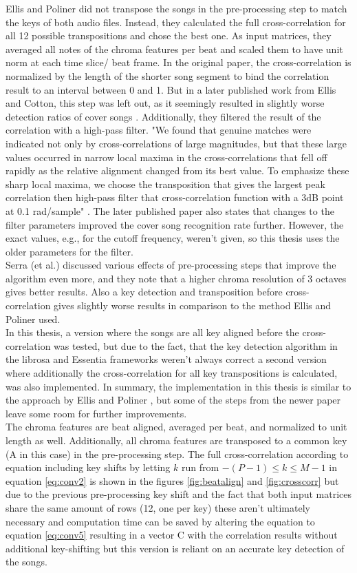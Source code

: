 Ellis and Poliner did not transpose the songs in the pre-processing step to match the keys of both audio files. Instead, they calculated the full cross-correlation for all 12 possible transpositions and chose the best one. 
As input matrices, they averaged all notes of the chroma features per beat and scaled them to have unit norm at each time slice/ beat frame.
In the original paper, the cross-correlation is normalized by the length of the shorter song segment to bind the correlation result to an interval between 0 and 1. But in a later published work from Ellis and Cotton, this step was left out, as it seemingly resulted in slightly worse detection ratios of cover songs \cite{cover802}. 
Additionally, they filtered the result of the correlation with a high-pass filter. "We found that genuine matches were indicated not only by cross-correlations of large magnitudes, but that these large values occurred in narrow local maxima in the cross-correlations that fell off rapidly as the relative alignment changed from its best value. To emphasize these sharp local maxima, we choose the transposition that gives the largest peak correlation then high-pass filter that cross-correlation function with a 3dB point at 0.1 rad/sample" \cite[p. 1431]{chroma3}. The later published paper \cite{cover802} also states that changes to the filter parameters improved the cover song recognition rate further. However, the exact values, e.g., for the cutoff frequency, weren't given, so this thesis uses the older parameters for the filter.\\
Serra (et al.) discussed various effects of pre-processing steps that improve the algorithm even more, and they note that a higher chroma resolution of 3 octaves gives better results. Also a key detection and transposition before cross-correlation gives slightly worse results in comparison to the method Ellis and Poliner used.\\ 
In this thesis, a version where the songs are all key aligned before the cross-correlation was tested, but due to the fact, that the key detection algorithm in the librosa and Essentia frameworks weren't always correct a second version where additionally the cross-correlation for all key transpositions is calculated, was also implemented. 
In summary, the implementation in this thesis is similar to the approach by Ellis and Poliner \cite{chroma3}, but some of the steps from the newer paper \cite{cover802} leave some room for further improvements.\\ The chroma features are beat aligned, averaged per beat, and normalized to unit length as well. Additionally, all chroma features are transposed to a common key (A in this case) in the pre-processing step. The full cross-correlation according to equation including key shifts by letting $k$ run from $-(P - 1) \leq k \leq M - 1$ in equation \ref{eq:conv2} is shown in the figures \ref{fig:beatalign} and \ref{fig:crosscorr} but due to the previous pre-processing key shift and the fact that both input matrices share the same amount of rows (12, one per key) these aren't ultimately necessary and computation time can be saved by altering the equation to equation \ref{eq:conv5} resulting in a vector C with the correlation results without additional key-shifting but this version is reliant on an accurate key detection of the songs.
